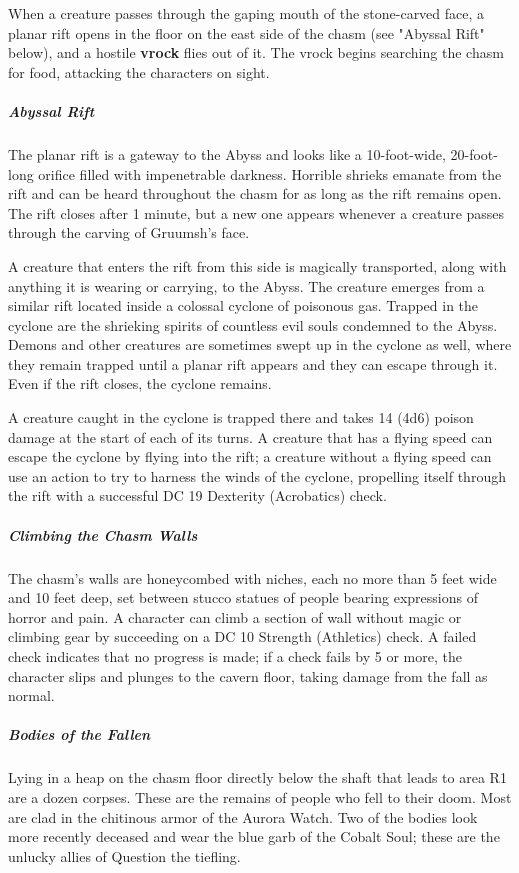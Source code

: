 \documentclass[10pt,a4paper,twoside,fancy,bg=print,twocolumn,openany,nodeprecatedcode]{dndbook}
\begin{document}
When a creature passes through the gaping mouth of the stone-carved face, a planar rift opens in the floor on the east side of the chasm (see "Abyssal Rift" below), and a hostile \textbf{vrock} flies out of it. The vrock begins searching the chasm for food, attacking the characters on sight.

\subparagraph{Abyssal Rift}
The planar rift is a gateway to the Abyss and looks like a 10-foot-wide, 20-foot-long orifice filled with impenetrable darkness. Horrible shrieks emanate from the rift and can be heard throughout the chasm for as long as the rift remains open. The rift closes after 1 minute, but a new one appears whenever a creature passes through the carving of Gruumsh's face.

A creature that enters the rift from this side is magically transported, along with anything it is wearing or carrying, to the Abyss. The creature emerges from a similar rift located inside a colossal cyclone of poisonous gas. Trapped in the cyclone are the shrieking spirits of countless evil souls condemned to the Abyss. Demons and other creatures are sometimes swept up in the cyclone as well, where they remain trapped until a planar rift appears and they can escape through it. Even if the rift closes, the cyclone remains.

A creature caught in the cyclone is trapped there and takes 14 (4d6) poison damage at the start of each of its turns. A creature that has a flying speed can escape the cyclone by flying into the rift; a creature without a flying speed can use an action to try to harness the winds of the cyclone, propelling itself through the rift with a successful DC 19 Dexterity (Acrobatics) check.

\subparagraph{Climbing the Chasm Walls}
The chasm's walls are honeycombed with niches, each no more than 5 feet wide and 10 feet deep, set between stucco statues of people bearing expressions of horror and pain. A character can climb a section of wall without magic or climbing gear by succeeding on a DC 10 Strength (Athletics) check. A failed check indicates that no progress is made; if a check fails by 5 or more, the character slips and plunges to the cavern floor, taking damage from the fall as normal.

\subparagraph{Bodies of the Fallen}
Lying in a heap on the chasm floor directly below the shaft that leads to area R1 are a dozen corpses. These are the remains of people who fell to their doom. Most are clad in the chitinous armor of the Aurora Watch. Two of the bodies look more recently deceased and wear the blue garb of the Cobalt Soul; these are the unlucky allies of Question the tiefling.
\end{document}
